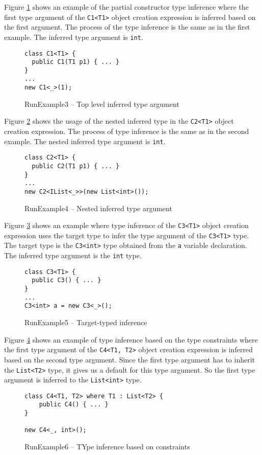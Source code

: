\par
Figure \ref{img102:example3} shows an example of the partial constructor type inference where the first type argument of the \texttt{C1<T1>} object creation expression is inferred based on the first argument.
The process of the type inference is the same as in the first example.
The inferred type argument is \texttt{int}.
\begin{figure}[!h]
\begin{lstlisting}[style=csharp, showstringspaces=false]
class C1<T1> {
  public C1(T1 p1) { ... }
}
...
new C1<_>(1);
\end{lstlisting}
\caption{RunExample3 -- Top level inferred type argument}
\label{img102:example3}
\end{figure}
\par
Figure \ref{img103:example4} shows the usage of the nested inferred type in the \texttt{C2<T1>} object creation expression.
The process of type inference is the same as in the second example.
The nested inferred type argument is \texttt{int}.
\begin{figure}[!h]
\begin{lstlisting}[style=csharp, showstringspaces=false]
class C2<T1> {
  public C2(T1 p1) { ... }
}
...
new C2<IList<_>>(new List<int>());
\end{lstlisting}
\caption{RunExample4 -- Nested inferred type argument}
\label{img103:example4}
\end{figure}
\par
Figure \ref{img104:example5} shows an example where type inference of the \texttt{C3<T1>} object creation expression uses the target type to infer the type argument of the \texttt{C3<T1>} type.
The target type is the \texttt{C3<int>} type obtained from the \texttt{a} variable declaration.
The inferred type argument is the \texttt{int} type.
\begin{figure}[!h]
\begin{lstlisting}[style=csharp, showstringspaces=false]
class C3<T1> {
  public C3() { ... }
}
...
C3<int> a = new C3<_>();
\end{lstlisting}
\caption{RunExample5 -- Target-typed inference}
\label{img104:example5}
\end{figure}
\par
Figure \ref{img105:example6} shows an example of type inference based on the type constraints where the first type argument of the \texttt{C4<T1, T2>} object creation expression is inferred based on the second type argument.
Since the first type argument has to inherit the \texttt{List<T2>} type, it gives us a default for this type argument.
So the first type argument is inferred to the \texttt{List<int>} type. 
\begin{figure}[!h]
\begin{lstlisting}[style=csharp, showstringspaces=false]
class C4<T1, T2> where T1 : List<T2> {
    public C4() { ... }
}
    
new C4<_, int>();
\end{lstlisting}
\caption{RunExample6 -- TYpe inference based on constraints}
\label{img105:example6}
\end{figure}

